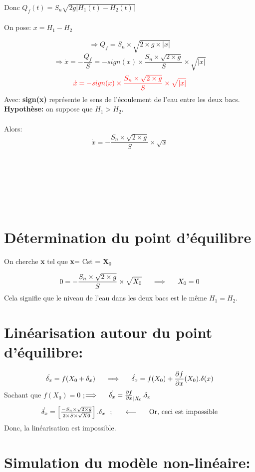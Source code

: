 Donc $Q_f(t)=S_n\sqrt{2g |H_1(t)-H_2(t)|}$\\\\
On pose:  $ x= H_1 - H_2$

\[\Longrightarrow Q_f=S_n\times \sqrt{2\times g \times |x|}\]
\[\Longrightarrow \dot{x}=-\frac{Q_f}{S}=-sign(x)\times \frac{S_n\times \sqrt{2\times g }}{S} \times \sqrt{|x|}\]
\[\color{red}\dot{x}=-sign(x)\times \frac{S_n\times \sqrt{2\times g }}{S} \times \sqrt{|x|}\]
 Avec: \textbf{sign(x)} représente le sens de l'écoulement de l'eau entre les deux bacs. \\
 
\textbf{Hypothèse:} on suppose que $H_1>H_2$.\\
\\
Alors:\indent \indent  \[\dot{x}= -\frac{S_n\times \sqrt{2\times g }}{S} \times \sqrt{x}\]
\\
\\
\\\\\\\\

\section{Détermination du point d'équilibre}

On cherche \textbf{x} tel que \textbf{x}= Cst = $\textbf{X}_0$

\[0=-\frac{S_n\times \sqrt{2\times g }}{S} \times \sqrt{X_0}\indent  \Longrightarrow \indent X_0 = 0\]
Cela signifie que le niveau de l'eau dans les deux bacs est le même $H_1=H_2$.

\section{Linéarisation autour du point d'équilibre:}

\[\dot{\delta_x}=f(X_0+\delta_x) \indent \Longrightarrow \indent \dot{\delta_x}=f(X_0)+\frac{\partial f}{\partial x}(X_0).\delta(x)\]
Sachant que $f(X_0)=0$ ;\indent  $\Longrightarrow \indent \dot{\delta_x}=\frac{\partial f}{\partial x}_{|X_0} . \delta_x$
\[\dot{\delta_x}=\begin{bmatrix}\frac{-S_n\times \sqrt{2\times g}}{2\times S \times \sqrt{X0}}\end{bmatrix}.\delta_x \ \ ; \indent \longleftarrow \indent \text{Or, ceci est impossible}\]
Donc, la linéarisation est impossible.

\section{Simulation du modèle non-linéaire:}


